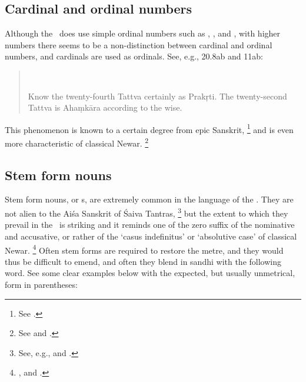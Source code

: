 \subsection{Cardinal and ordinal numbers}

Although the \VSS\ does use simple ordinal numbers such 
as , , and , with higher 
numbers there seems to be a non-distinction between cardinal
and ordinal numbers, and cardinals are used as ordinals.
See, e.g., 20.8ab and 11ab:

\begin{quote}
\\

Know the twenty-fourth Tattva certainly as Prakṛti.
The twenty-second Tattva is Ahaṃkāra according to the wise.
\end{quote}

\noindent
This phenomenon is known to a certain degree
from epic Sanskrit,%
	\footnote{See .}
and is even more characteristic of classical Newar.%
		\footnote{See  and
									 .}





\subsection{Stem form nouns}\label{stemform}

Stem form nouns, or s, are extremely common in the
language of the \VSS. They are not alien to the Aiśa Sanskrit
of Śaiva Tantras,%
		\footnote{See, e.g.,  and
								.}
but the extent to which they prevail in the \VSS\ is striking and it
reminds one of the zero suffix of the nominative and accusative,
or rather of the `casus indefinitus' or `absolutive case' of classical Newar.%
		\footnote{,
		 and .} 
Often stem forms are required to restore the metre, 
and they would thus be difficult to emend,
and often they blend in sandhi with the following word. 
See some clear examples below with the expected, 
but usually unmetrical, form in parentheses:

